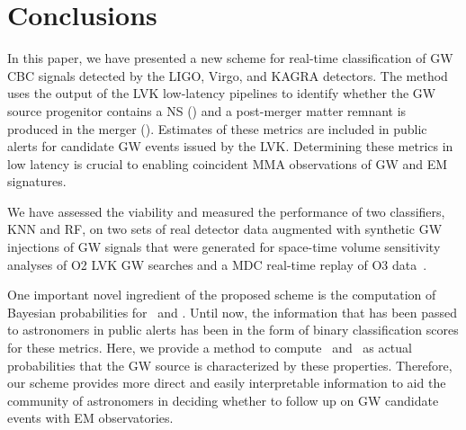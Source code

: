 \section{Conclusions\label{conclusions}}


In this paper, we have presented a new scheme for real-time classification of \ac{GW} \ac{CBC} signals detected by the LIGO, Virgo, and KAGRA detectors. The method uses the
output of the \ac{LVK} low-latency pipelines to identify whether the GW source progenitor contains a \ac{NS} (\hasns) and a post-merger matter remnant is produced in the merger
(\hasrem). Estimates of these metrics are included in public alerts for candidate \ac{GW} events issued by the \ac{LVK}. Determining these metrics in low latency is crucial to
enabling coincident \ac{MMA} observations of GW and \ac{EM} signatures.

We have assessed the viability and measured the performance of two classifiers, \ac{KNN} and \ac{RF}, on two sets of real detector data augmented with synthetic GW injections of
GW signals that were generated for space-time volume sensitivity analyses of \ac{O2} \ac{LVK} \ac{GW} searches \cite{Chatterjee:2019avs} and a \ac{MDC} real-time
replay of \ac{O3} data~\cite{Chaudhary:2023vec}. 


One important novel ingredient of the proposed scheme is the computation of Bayesian probabilities for \hasns\ and \hasrem. Until now, the information that has been passed to
astronomers in public alerts has been in the form of binary classification scores for these metrics. Here, we provide a method to compute \hasns\ and \hasrem\ as actual
probabilities that the \ac{GW} source is characterized by these properties. Therefore, our scheme provides more direct and easily interpretable information to aid the community
of astronomers in deciding whether to follow up on \ac{GW} candidate events with \ac{EM} observatories.


